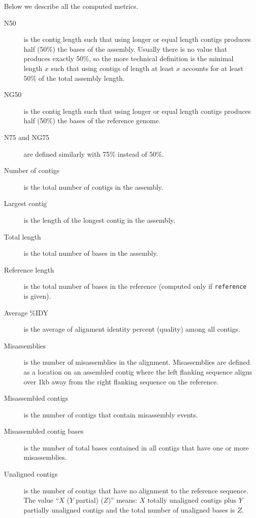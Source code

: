 \documentclass{article}
\begin{document}
Below we describe all the computed metrics.

\begin{description}
\item[N50] is the contig length such that using longer or equal length contigs
produces half (50\%) the bases of the assembly.  Usually there is no
value that produces exactly 50\%, so the more technical definition is
the minimal length $x$ such that using contigs of length at least $x$ accounts for at least 50\% of the total assembly length.

\item[NG50] is the contig length such that using longer or equal length contigs
produces half (50\%) the bases of the reference genome.

\item[N75 and NG75] are defined similarly with 75\% instead of 50\%.

\item[Number of contigs] is the total number of contigs in the assembly.

\item[Largest contig] is the length of the longest contig in the assembly.

\item[Total length] is the total number of bases in the assembly.

\item[Reference length] is the total number of bases in the reference
(computed only if {\tt reference} is given).

\item[Average \%IDY] is the average of alignment identity percent (quality) among all contigs.

\item[Misassemblies] is the number of misassemblies in the alignment.
Misassemblies are defined as a location on an assembled contig where the left
flanking sequence aligns over 1kb away from the right flanking sequence on the
reference.

\item[Misassembled contigs] is the number of contigs that contain misassembly
events.

\item[Misassembled contig bases] is the number of total bases contained in all
contigs that have one or more misassemblies.

\item[Unaligned contigs] is the number of contigs that have no alignment to the
reference sequence.  The value ``$X$ ($Y$ partial) ($Z$)'' means:
$X$ totally unaligned contigs
plus $Y$ partially unaligned contigs
and the total number of unaligned bases is $Z$.


\end{description}
\end{document}
